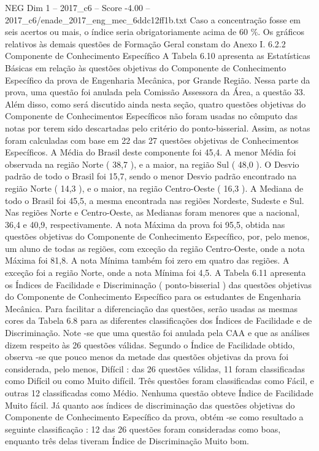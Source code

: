 \begin{textsample}{NEG Dim 1 – 2017\_c6 – Score -4.00 – 2017\_c6/enade\_2017\_eng\_mec\_6ddc12ff1b.txt}
Caso a concentração fosse em seis acertos ou mais, o índice seria obrigatoriamente acima de 60 \%.
Os gráficos relativos às demais questões de Formação Geral constam do Anexo I. 6.2.2 Componente de Conhecimento Específico A Tabela 6.10 apresenta as Estatísticas Básicas em relação às questões objetivas do Componente de Conhecimento Específico da prova de Engenharia Mecânica, por Grande Região.
Nessa parte da prova, uma questão foi anulada pela Comissão Assessora da Área, a questão 33.
Além disso, como será discutido ainda nesta seção, quatro questões objetivas do Componente de Conhecimentos Específicos não foram usadas no cômputo das notas por terem sido descartadas pelo critério do ponto-bisserial.
Assim, as notas foram calculadas com base em 22 das 27 questões objetivas de Conhecimentos Específicos.
A Média do Brasil deste componente foi 45,4.
A menor Média foi observada na região Norte ( 38,7 ), e a maior, na região Sul ( 48,0 ).
O Desvio padrão de todo o Brasil foi 15,7, sendo o menor Desvio padrão encontrado na região Norte ( 14,3 ), e o maior, na região Centro-Oeste ( 16,3 ).
A Mediana de todo o Brasil foi 45,5, a mesma encontrada nas regiões Nordeste, Sudeste e Sul.
Nas regiões Norte e Centro-Oeste, as Medianas foram menores que a nacional, 36,4 e 40,9, respectivamente.
A nota Máxima da prova foi 95,5, obtida nas questões objetivas do Componente de Conhecimento Específico, por, pelo menos, um aluno de todas as regiões, com exceção da região Centro-Oeste, onde a nota Máxima foi 81,8.
A nota Mínima também foi zero em quatro das regiões.
A exceção foi a região Norte, onde a nota Mínima foi 4,5.
A Tabela 6.11 apresenta os Índices de Facilidade e Discriminação ( ponto-bisserial ) das questões objetivas do Componente de Conhecimento Específico para os estudantes de Engenharia Mecânica.
Para facilitar a diferenciação das questões, serão usadas as mesmas cores da Tabela 6.8 para as diferentes classificações dos Índices de Facilidade e de Discriminação.
Note -se que uma questão foi anulada pela CAA e que as análises dizem respeito às 26 questões válidas.
Segundo o Índice de Facilidade obtido, observa -se que pouco menos da metade das questões objetivas da prova foi considerada, pelo menos, Difícil : das 26 questões válidas, 11 foram classificadas como Difícil ou como Muito difícil.
Três questões foram classificadas como Fácil, e outras 12 classificadas como Médio.
Nenhuma questão obteve Índice de Facilidade Muito fácil.
Já quanto aos índices de discriminação das questões objetivas do Componente de Conhecimento Específico da prova, obtém -se como resultado a seguinte classificação : 12 das 26 questões foram consideradas como boas, enquanto três delas tiveram Índice de Discriminação Muito bom.

\end{textsample}

